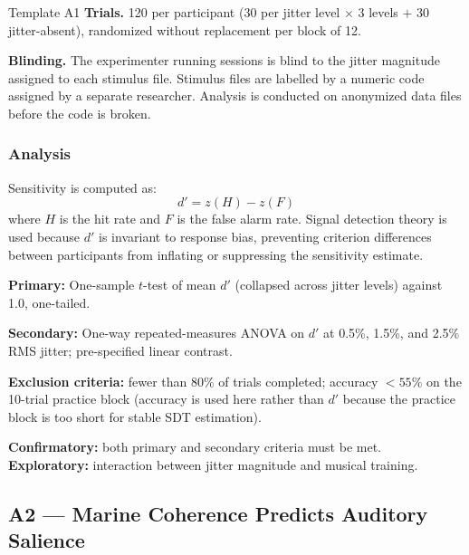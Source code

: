 \documentclass[11pt, a4paper]{article}
\begin{document}
\begin{predbox}{Template A1}
\textbf{Trials.}
120 per participant (30 per jitter level $\times$ 3 levels $+$ 30 jitter-absent),
randomized without replacement per block of 12.

\textbf{Blinding.}
The experimenter running sessions is blind to the jitter magnitude assigned to
each stimulus file.  Stimulus files are labelled by a numeric code assigned by
a separate researcher.  Analysis is conducted on anonymized data files before
the code is broken.

\subsubsection{Analysis}

Sensitivity is computed as:
\[
  d' = z(H) - z(F)
\]
where $H$ is the hit rate and $F$ is the false alarm rate.  Signal detection
theory is used because $d'$ is invariant to response bias, preventing
criterion differences between participants from inflating or suppressing the
sensitivity estimate.

\textbf{Primary:} One-sample $t$-test of mean $d'$ (collapsed across jitter
levels) against 1.0, one-tailed.

\textbf{Secondary:} One-way repeated-measures ANOVA on $d'$ at 0.5\%, 1.5\%,
and 2.5\% RMS jitter; pre-specified linear contrast.

\textbf{Exclusion criteria:} fewer than 80\% of trials completed; accuracy
$< 55\%$ on the 10-trial practice block (accuracy is used here rather than
$d'$ because the practice block is too short for stable SDT estimation).

\textbf{Confirmatory:} both primary and secondary criteria must be met.
\textbf{Exploratory:} interaction between jitter magnitude and musical training.

\end{predbox}

\subsection{A2 — Marine Coherence Predicts Auditory Salience}
\end{document}
